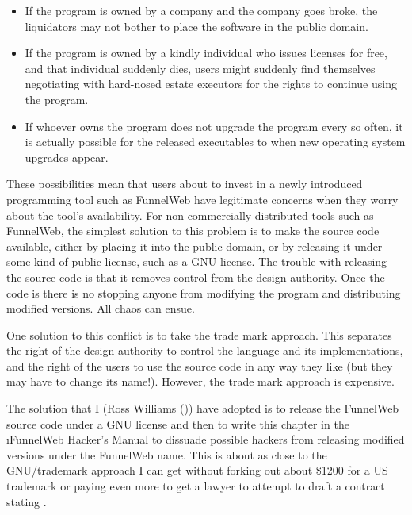 \begin{itemize}

\item If the program is owned by a company and the company goes broke,
the liquidators may not bother to place the software in the public domain.

\item If the program is owned by a kindly individual who issues licenses
for free, and that individual suddenly dies, users might suddenly find
themselves negotiating with hard-nosed estate executors for the rights
to continue using the program.

\item If whoever owns the program does not upgrade the program every so
often, it is actually possible for the released
executables to  when new operating system upgrades appear.

\end{itemize}

These possibilities mean that users about to invest in a newly
introduced programming
tool such as FunnelWeb have legitimate concerns when they worry
about the tool's availability. For non-commercially
distributed  tools such as FunnelWeb, the simplest solution to this
problem is to make the source code available, either by placing it
into the public domain, or by releasing it under some kind of
public license, such as a GNU license.
The trouble with releasing the source code
is that it removes control from the design
authority. Once the code is  there is no stopping anyone
from modifying the program and distributing modified versions.
All chaos can ensue.

One solution to this conflict is to take the trade mark approach. This
separates the right of the design authority to control the language and
its implementations, and the right of the users to use the source
code in any way they like (but they may have to change its name!).
However, the trade mark approach is expensive.

The solution that I (Ross Williams ())
have adopted is to release the FunnelWeb source code under a GNU license
and then to write this chapter in the \i{FunnelWeb
Hacker's Manual} to dissuade possible hackers from
releasing modified versions under the FunnelWeb name.
This is about as close to the GNU/trademark approach
I can get without forking out about \$1200 for a US trademark
or paying even more to get a lawyer to attempt to draft a contract
stating .

